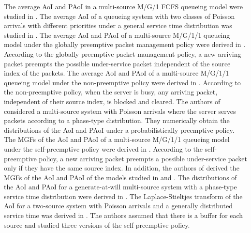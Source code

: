 \documentclass[conference]{IEEEtran}
\begin{document}
The average AoI and PAoI in a multi-source M/G/1 FCFS queueing model were studied in    
\cite{9099557,inoue2024exact}.
The average AoI of a queueing system with two classes of Poisson arrivals with different priorities under a general service time distribution was studied in \cite{8886357}. 
The average AoI and PAoI of a multi-source M/G/1/1 queueing model under the globally preemptive packet management policy were derived in \cite{8406928}.  According to the globally preemptive packet management policy, a new arriving packet preempts the possible under-service packet independent of the source index of the packets.
The average AoI and PAoI of a multi-source M/G/1/1 queueing model under the non-preemptive policy were derived in \cite{9500775}. According to the non-preemptive policy, when the server is busy, any arriving packet, independent of their source index, is blocked and cleared.  
 The authors of \cite{9519697} considered a multi-source system with Poisson arrivals where the server serves packets according to a phase-type distribution. 
 They numerically obtain the distributions of the AoI and PAoI under a probabilistically preemptive policy. 
The MGFs of the AoI and PAoI of a multi-source M/G/1/1 queueing model under the self-preemptive policy were derived in \cite{9869867}. According to the self-preemptive policy, a new arriving packet preempts a possible under-service packet only if they have the same source index. In addition, the authors of \cite{9869867} derived the MGFs of the AoI and PAoI of the models studied in \cite{9500775} and \cite{9869867}.
The distributions of the AoI and PAoI for a generate-at-will multi-source system with a phase-type service time distribution were derived in \cite{10139823}.
The Laplace-Stieltjes transform of the AoI for a two-source system with Poisson arrivals and a generally distributed service time was derived in \cite{10038591}. The authors assumed that there is a buffer for each source and studied three versions of the self-preemptive policy. 





\end{document}
